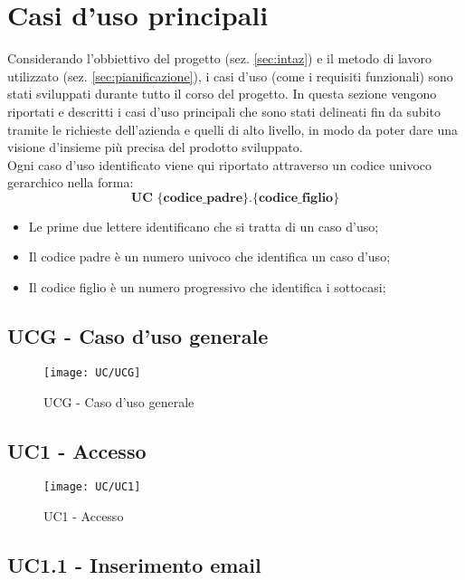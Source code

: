 \section{Casi d'uso principali}
Considerando l'obbiettivo del progetto (sez. \ref{sec:intaz}) e il metodo di 
lavoro utilizzato (sez. \ref{sec:pianificazione}), i casi d'uso (come i requisiti 
funzionali) sono stati sviluppati durante tutto il corso del progetto. 
In questa sezione vengono riportati e descritti i casi d'uso principali che 
sono stati delineati fin da subito tramite le richieste dell'azienda e quelli 
di alto livello, in modo da poter dare una visione d’insieme più precisa del 
prodotto sviluppato. \\

Ogni caso d'uso identificato viene qui riportato attraverso un codice univoco 
gerarchico nella forma:
$$ \textbf{UC \{codice\_padre\}.\{codice\_figlio\}  } $$
\begin{itemize}
	\item Le prime due lettere identificano che si tratta di un caso d'uso;
	\item Il codice padre è un numero univoco che identifica un caso d'uso;
	\item Il codice figlio è un numero progressivo che identifica i sottocasi;\\
\end{itemize}

\subsection{UCG - Caso d'uso generale}
\begin{figure}[H] 
	\centering
	\texttt{[image: UC/UCG]}
	\caption{UCG - Caso d'uso generale}
\end{figure}


\subsection{UC1 - Accesso}
\begin{figure}[H] 
	\centering
	\texttt{[image: UC/UC1]}
	\caption{UC1 - Accesso}
\end{figure}

\subsection{UC1.1 - Inserimento email}
